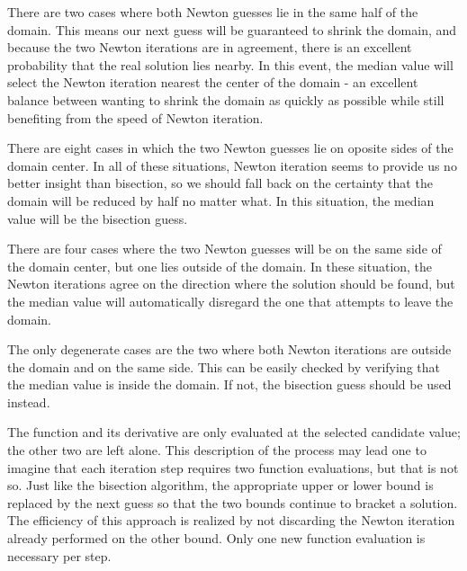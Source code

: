 \documentclass{article}
\begin{document}
There are two cases where both Newton guesses lie in the same half of the domain.  This means our next guess will be guaranteed to shrink the domain, and because the two Newton iterations are in agreement, there is an excellent probability that the real solution lies nearby.  In this event, the median value will select the Newton iteration nearest the center of the domain - an excellent balance between wanting to shrink the domain as quickly as possible while still benefiting from the speed of Newton iteration.

There are eight cases in which the two Newton guesses lie on oposite sides of the domain center.  In all of these situations, Newton iteration seems to provide us no better insight than bisection, so we should fall back on the certainty that the domain will be reduced by half no matter what.  In this situation, the median value will be the bisection guess.

There are four cases where the two Newton guesses will be on the same side of the domain center, but one lies outside of the domain.  In these situation, the Newton iterations agree on the direction where the solution should be found, but the median value will automatically disregard the one that attempts to leave the domain.

The only degenerate cases are the two where both Newton iterations are outside the domain and on the same side.  This can be easily checked by verifying that the median value is inside the domain.  If not, the bisection guess should be used instead.

The function and its derivative are only evaluated at the selected candidate value; the other two are left alone.  This description of the process may lead one to imagine that each iteration step requires two function evaluations, but that is not so.  Just like the bisection algorithm, the appropriate upper or lower bound is replaced by the next guess so that the two bounds continue to bracket a solution.  The efficiency of this approach is realized by not discarding the Newton iteration already performed on the other bound.  Only one new function evaluation is necessary per step.
\end{document}
